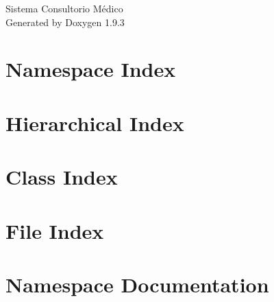 \documentclass[twoside]{book}
\newcommand{\+}{\discretionary{\mbox{\scriptsize$\hookleftarrow$}}{}{}}
\newcommand{\clearemptydoublepage}{%
    \newpage{\pagestyle{empty}\cleardoublepage}%
  }
\begin{document}
  \raggedbottom
    \hypersetup{pageanchor=false,
                bookmarksnumbered=true,
                pdfencoding=unicode
               }
  \begin{titlepage}
  \vspace*{7cm}
  \begin{center}%
  {\Large Sistema Consultorio Médico}\\
  \vspace*{1cm}
  {\large Generated by Doxygen 1.9.3}\\
  \end{center}
  \end{titlepage}
  \clearemptydoublepage
  \tableofcontents
  \clearemptydoublepage
  \hypersetup{pageanchor=true}
\chapter{Namespace Index}

\chapter{Hierarchical Index}

\chapter{Class Index}

\chapter{File Index}

\chapter{Namespace Documentation}




\end{document}
